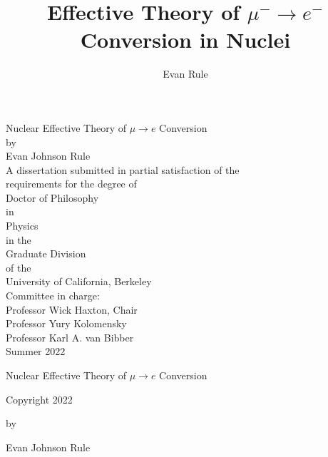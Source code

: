 \documentclass[12pt,letterpaper]{book}
\title{Effective Theory of $\mu^-\rightarrow e^-$ Conversion in Nuclei}
\author{Evan Rule}
\begin{document}
\begin{titlepage}
\begin{center}
\vspace*{1cm}
Nuclear Effective Theory of $\mu\rightarrow e$ Conversion\\
\vspace*{1cm}
by\\
\vspace*{0.5cm}
Evan Johnson Rule\\
\vspace*{1cm}
A dissertation submitted in partial satisfaction of the\\
\vspace*{0.25cm}
requirements for the degree of\\
\vspace*{0.25cm}
Doctor of Philosophy\\
\vspace*{0.25cm}
in\\
\vspace*{0.25cm}
Physics\\
\vspace*{0.25cm}
in the \\
\vspace*{0.25cm}
Graduate Division\\
\vspace*{0.25cm}
of the\\
\vspace*{0.25cm}
University of California, Berkeley\\
\vspace*{2cm}
Committee in charge:\\
\vspace*{1cm}
Professor Wick Haxton, Chair\\
\vspace*{0.25cm}
Professor Yury Kolomensky\\
\vspace*{0.25cm}
Professor Karl A. van Bibber\\
\vspace*{2cm}
Summer 2022
\end{center}
\end{titlepage}
\begin{center}
Nuclear Effective Theory of $\mu\rightarrow e$ Conversion

\vspace{4cm}
Copyright 2022

by

Evan Johnson Rule
\end{center}
\end{document}
